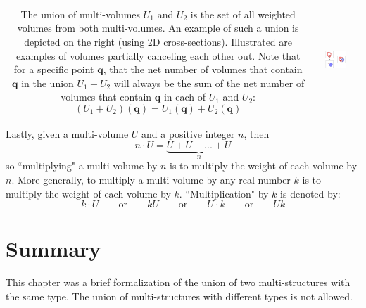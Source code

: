 \begin{tabular}{cc}
\parbox{0.5\textwidth}{
The union of multi-volumes \(U_1\) and \(U_2\) is the set of all weighted volumes from both multi-volumes. An example of such a union is depicted on the right (using 2D cross-sections). Illustrated are examples of volumes partially canceling each other out. Note that for a specific point \(\mathbf{q}\), that the net number of volumes that contain \(\mathbf{q}\) in the union \(U_1 + U_2\) will always be the sum of the net number of volumes that contain \(\mathbf{q}\) in each of \(U_1\) and \(U_2\): 
\[(U_1 + U_2)(\mathbf{q}) = U_1(\mathbf{q}) + U_2(\mathbf{q})\]
} & \parbox{0.5\textwidth}{
\includegraphics[width = 0.5\textwidth]{Unions/multivolume_unions}
}
\end{tabular}

Lastly, given a multi-volume \(U\) and a positive integer \(n\), then
\[n \cdot U = \underbrace{U + U + ... + U}_n\]
so ``multiplying" a multi-volume by \(n\) is to multiply the weight of each volume by \(n\). More generally, to multiply a multi-volume by any real number \(k\) is to multiply the weight of each volume by \(k\). ``Multiplication" by \(k\) is denoted by:
\[k \cdot U \quad\quad\text{or}\quad\quad k U \quad\quad\text{or}\quad\quad U \cdot k \quad\quad\text{or}\quad\quad U k\]




\section{Summary}

This chapter was a brief formalization of the union of two multi-structures with the same type. The union of multi-structures with different types is not allowed.


